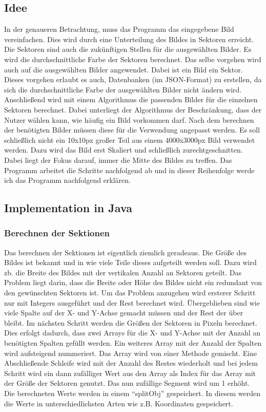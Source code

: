 \subsection{Idee}
In der genaueren Betrachtung, muss das Programm das eingegebene Bild vereinfachen. Dies wird durch eine Unterteilung des Bildes in Sektoren erreicht. Die Sektoren sind auch die zukünftigen Stellen für die ausgewählten Bilder. Es wird die durchschnittliche Farbe der Sektoren berechnet. Das selbe vorgehen wird auch auf die ausgewählten Bilder angewendet. Dabei ist ein Bild ein Sektor. Dieses vorgehen erlaubt es auch, Datenbanken (im JSON-Format) zu erstellen, da sich die durchschnittliche Farbe der ausgewählten Bilder nicht ändern wird. Anschließend wird mit einem Algorithmus die passenden Bilder für die einzelnen Sektoren berechnet. Dabei unterliegt der Algorithmus der Beschränkung, dass der Nutzer wählen kann, wie häufig ein Bild vorkommen darf. Nach dem berechnen der benötigten Bilder müssen diese für die Verwendung angepasst werden. Es soll schließlich nicht ein 10x10px großer Teil aus einem 4000x3000px Bild verwendet werden. Dazu wird das Bild erst Skaliert und schließlich zurechtgeschnitten. Dabei liegt der Fokus darauf, immer die Mitte des Bildes zu treffen. Das Programm arbeitet die Schritte nachfolgend ab und in dieser Reihenfolge werde ich das Programm nachfolgend erklären.

\subsection{Implementation in Java}
\subsubsection{Berechnen der Sektionen}
Das berechnen der Sektionen ist eigentlich ziemlich geradeaus. Die Größe des Bildes ist bekannt und in wie viele Teile dieses aufgeteilt werden soll. Dazu wird zb. die Breite des Bildes mit der vertikalen Anzahl an Sektoren geteilt. Das Problem liegt darin, dass die Breite oder Höhe des Bildes nicht ein redundant von den gewünschten Sektoren ist. Um das Problem anzugehen wird ersterer Schritt nur mit Integers ausgeführt und der Rest berechnet wird. Übergeblieben sind wie viele Spalte auf der X- und Y-Achse gemacht müssen und der Rest der über bleibt. Im nächsten Schritt werden die Größen der Sektoren in Pixeln berechnet. Dies erfolgt dadurch, dass zwei Arrays für die X- und Y-Achse mit der Anzahl an benötigten Spalten gefüllt werden. Ein weiteres Array mit der Anzahl der Spalten wird aufsteigend nummeriert. Das Array wird von einer Methode gemischt. Eine Abschließende Schleife wird mit der Anzahl des Restes wiederholt und bei jedem Schritt wird ein dann zufälliger Wert aus den Array als Index für das Array mit der Größe der Sektoren genutzt. Das nun zufällige Segment wird um 1 erhöht. Die berechneten Werte werden in einem ``splitObj'' gespeichert. In diesem werden die Werte in unterschiedlichsten Arten wie z.B. Koordinaten gespeichert. 

